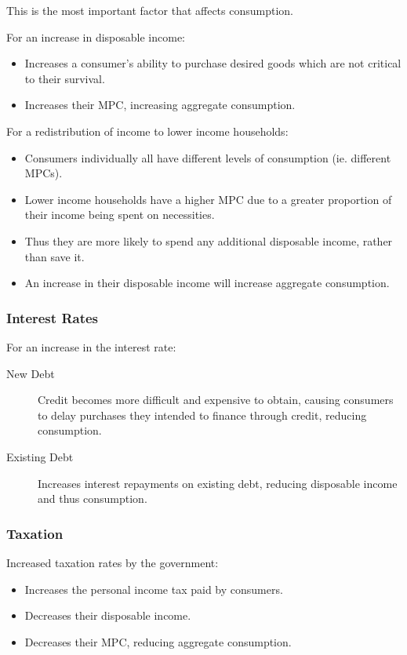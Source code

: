 \documentclass[a4paper,11pt]{report}
\begin{document}
This is the most important factor that affects consumption.

For an increase in disposable income:

\begin{itemize}
\item Increases a consumer's ability to purchase desired goods which are not
	critical to their survival.
\item Increases their MPC, increasing aggregate consumption.
\end{itemize}

For a redistribution of income to lower income households:

\begin{itemize}
\item Consumers individually all have different levels of consumption (ie.
	different MPCs).
\item Lower income households have a higher MPC due to a greater proportion of
	their income being spent on necessities.
\item Thus they are more likely to spend any additional disposable income,
	rather than save it.
\item An increase in their disposable income will increase aggregate
	consumption.
\end{itemize}

\subsubsection{Interest Rates}

For an increase in the interest rate:

\begin{description}
\item [New Debt] Credit becomes more difficult and expensive to obtain, causing
	consumers to delay purchases they intended to finance through credit,
	reducing consumption.
\item [Existing Debt] Increases interest repayments on existing debt, reducing
	disposable income and thus consumption.
\end{description}

\subsubsection{Taxation}

Increased taxation rates by the government:

\begin{itemize}
\item Increases the personal income tax paid by consumers.
\item Decreases their disposable income.
\item Decreases their MPC, reducing aggregate consumption.
\end{itemize}
\end{document}
